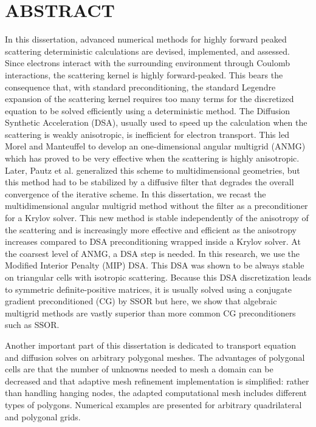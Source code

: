\chapter*{ABSTRACT}
\pagestyle{plain}
\setcounter{page}{2}
\indent In this dissertation, advanced numerical methods for highly forward
peaked scattering deterministic calculations are devised, implemented, and
assessed. Since electrons interact with the surrounding environment through
Coulomb interactions, the scattering kernel is highly forward-peaked. 
This bears the consequence that, with standard preconditioning, the standard Legendre
expansion of the scattering kernel requires too many terms for the discretized
equation to be solved efficiently using a deterministic method. The Diffusion
Synthetic Acceleration (DSA), usually used to speed up the calculation when
the scattering is weakly anisotropic, is inefficient for electron transport.
This led Morel and Manteuffel to develop an one-dimensional angular multigrid
(ANMG) which has proved to be very effective when the scattering is highly
anisotropic. Later, Pautz et al. generalized this scheme to multidimensional
geometries, but this method had to be stabilized by a diffusive filter that
degrades the overall convergence of the iterative scheme. In this dissertation, we
recast the multidimensional angular multigrid method without the filter as a
preconditioner for a Krylov solver. This new method is stable independently of
the anisotropy of the scattering and is increasingly more effective and
efficient as the anisotropy increases compared to DSA preconditioning wrapped
inside a Krylov solver. At the coarsest level of ANMG, a DSA step is needed. In
this research, we use the Modified Interior Penalty (MIP) DSA. This DSA was
shown to be always stable on triangular cells with isotropic scattering. 
Because this DSA discretization leads to symmetric definite-positive matrices, 
it is usually solved using a conjugate gradient preconditioned (CG) by SSOR but
here, we show that algebraic multigrid methods are vastly superior than more common
CG preconditioners such as SSOR.

Another important part of this dissertation is dedicated to transport 
equation and diffusion solves on arbitrary polygonal meshes. The advantages of
polygonal cells are that the number of unknowns needed to mesh a domain can be
decreased and that adaptive mesh refinement implementation is simplified:
rather than handling hanging nodes, the adapted computational mesh includes 
different types of polygons. Numerical examples are presented for arbitrary
quadrilateral and polygonal grids.
\pagebreak{}

